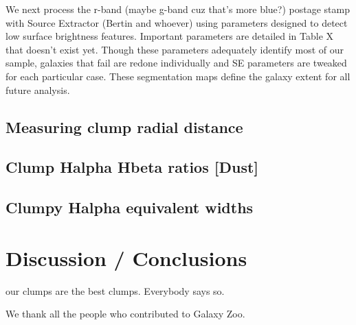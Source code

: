 We next process the r-band (maybe g-band cuz that's more blue?) postage stamp with Source Extractor (Bertin and whoever) using parameters designed to detect low surface brightness features. Important parameters are detailed in Table X that doesn't exist yet. Though these parameters adequately identify most of our sample, galaxies that fail are redone individually and SE parameters are tweaked for each particular case. These segmentation maps define the galaxy extent for all future analysis. 



\subsection{Measuring clump radial distance} \label{subsec:radii}


\subsection{Clump Halpha Hbeta ratios [Dust]} \label{subsec:dust}

\subsection{Clumpy Halpha equivalent widths} \label{subsec:ew}





\section{Discussion / Conclusions}
our clumps are the best clumps. Everybody says so. 


We thank all the people who contributed to Galaxy Zoo. 